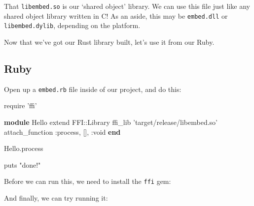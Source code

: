 \documentclass[a4paper,]{book}
\newenvironment{Shaded}{\begin{snugshade}}{\end{snugshade}}
\newcommand{\KeywordTok}[1]{\textcolor[rgb]{0.13,0.29,0.53}{\textbf{{#1}}}}
\newcommand{\DataTypeTok}[1]{\textcolor[rgb]{0.13,0.29,0.53}{{#1}}}
\newcommand{\StringTok}[1]{\textcolor[rgb]{0.31,0.60,0.02}{{#1}}}
\newcommand{\CommentTok}[1]{\textcolor[rgb]{0.56,0.35,0.01}{\textit{{#1}}}}
\newcommand{\NormalTok}[1]{{#1}}
\begin{document}
That \texttt{libembed.so} is our `shared object' library. We can use
this file just like any shared object library written in C! As an aside,
this may be \texttt{embed.dll} or \texttt{libembed.dylib}, depending on
the platform.

Now that we've got our Rust library built, let's use it from our Ruby.

\subsection{Ruby}\label{ruby}

Open up a \texttt{embed.rb} file inside of our project, and do this:

\begin{Shaded}
\begin{Highlighting}[]
\NormalTok{require }\StringTok{'ffi'}

\KeywordTok{module} \DataTypeTok{Hello}
  \NormalTok{extend }\DataTypeTok{FFI}\NormalTok{::}\DataTypeTok{Library}
  \NormalTok{ffi_lib }\StringTok{'target/release/libembed.so'}
  \NormalTok{attach_function }\StringTok{:process}\NormalTok{, [], }\StringTok{:void}
\KeywordTok{end}

\DataTypeTok{Hello}\NormalTok{.process}

\NormalTok{puts }\StringTok{"done!"}
\end{Highlighting}
\end{Shaded}

Before we can run this, we need to install the \texttt{ffi} gem:

\begin{Shaded}
\end{Shaded}

And finally, we can try running it:

\begin{Shaded}
\end{Shaded}
\end{document}
